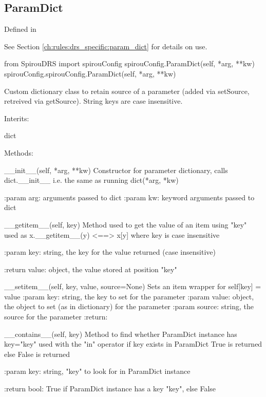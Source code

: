 \begin{minipage}{\textwidth}
\subsection{ParamDict}
\label{ch:the_module:spirouConfig:ParamDict}

Defined in \spirouConfig{}

See Section \ref{ch:rules:drs_specific:param_dict} for details on use.

\begin{pythonbox}
from SpirouDRS import spirouConfig
spirouConfig.ParamDict(self, *arg, **kw)
spirouConfig.spirouConfig.ParamDict(self, *arg, **kw)
\end{pythonbox}

\begin{pythondocstring}
Custom dictionary class to retain source of a parameter (added via setSource,
retreived via getSource). String keys are case insensitive.

Interits:

	dict

Methods:

	__init__(self, *arg, **kw)
	        Constructor for parameter dictionary, calls dict.__init__
	        i.e. the same as running dict(*arg, *kw)

	        :param arg: arguments passed to dict
	        :param kw: keyword arguments passed to dict

	__getitem__(self, key)
	        Method used to get the value of an item using "key"
	        used as x.__getitem__(y) <==> x[y]
	        where key is case insensitive

	        :param key: string, the key for the value returned (case insensitive)

	        :return value: object, the value stored at position "key"

 	__setitem__(self, key, value, source=None)
	        Sets an item wrapper for self[key] = value
	        :param key: string, the key to set for the parameter
	        :param value: object, the object to set (as in dictionary) for the
	                      parameter
	        :param source: string, the source for the parameter
	        :return:

	__contains__(self, key)
	        Method to find whether ParamDict instance has key="key"
	        used with the "in" operator
	        if key exists in ParamDict True is returned else False is returned

	        :param key: string, "key" to look for in ParamDict instance

	        :return bool: True if ParamDict instance has a key "key", else False

\end{pythondocstring}
\end{minipage}

